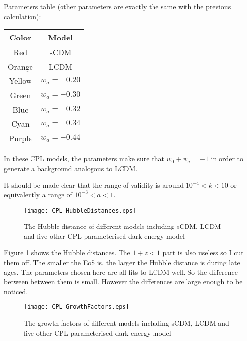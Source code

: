 Parameters table (other parameters are exactly the same with the previous calculation):

\vspace{2ex}
\begin{center}
\begin{tabular}{|c|c|}\hline
{\bf Color} & {\bf Model} \\\hline
Red & sCDM \\\hline
Orange & LCDM \\\hline
Yellow & $w_a=-0.20$ \\ \hline
Green &  $w_a=-0.30$ \\ \hline
Blue & $w_a=-0.32$ \\ \hline
Cyan & $w_a=-0.34$ \\ \hline
Purple & $w_a=-0.44$ \\ \hline
\end{tabular}
\end{center}
\vspace{2ex}

In these CPL models, the parameters make sure that $w_0+w_a=-1$ in order to generate a background analogous to LCDM.

It should be made clear that the range of validity is around $10^{-4}<k<10$ or equivalently a range of $10^{-3}<a<1$.




\begin{figure}[!htbp]
\centering
\texttt{[image: CPL\_HubbleDistances.eps]}
\caption{The Hubble distance of different models including sCDM, LCDM and five other CPL parameterised dark energy model}\label{fig:CPL_HubbleDistances}
\end{figure}

Figure \ref{fig:CPL_HubbleDistances}  shows the Hubble distances. The $1+z<1$ part is also useless so I cut them off. The smaller the EoS is, the larger the Hubble distance is during late ages. The parameters chosen here are all fits to LCDM well. So the difference between between them is small. However the differences are large enough to be noticed.



\begin{figure}[!htbp]
\centering
\texttt{[image: CPL\_GrowthFactors.eps]}
\caption{The growth factors of different models including sCDM, LCDM and five other CPL parameterised dark energy model}\label{fig:CPL_GrowthFactors}
\end{figure}



